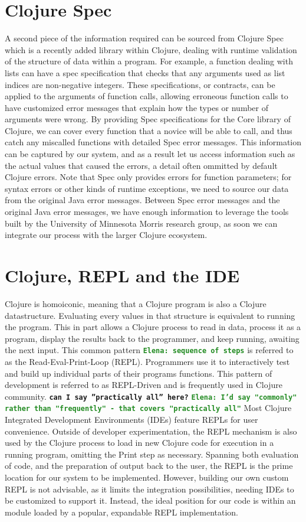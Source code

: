 \documentclass[12pt]{article}
\newcommand{\comment}[1]{{\bf \tt  {#1}}}
\newcommand{\emcomment}[1]{\textcolor{ForestGreen}{\comment{Elena: {#1}}}}
\begin{document}
\section{Clojure Spec}
A second piece of the information required can be sourced from Clojure Spec~\cite{spec}
which is a recently added library within Clojure, dealing with runtime validation of
the structure of data within a program. For example, a function dealing with
lists can have a spec specification that checks that any arguments used as list indices
are non-negative integers.
These specifications, or contracts, can be applied to
 the arguments of function calls, allowing erroneous function calls to have
customized error messages that explain how the types or number of arguments were wrong.
By providing Spec specifications for the Core library of Clojure,
 we can cover every function that a novice will be able to call, and thus catch
 any miscalled functions with detailed Spec error messages.
 This information can be captured by our system, and as a result
 let us access information such as the actual values that caused the errors,
 a detail often ommitted by default Clojure errors.
Note that Spec only provides errors for function parameters; for syntax errors or other kinds of
runtime exceptions, we need to source our data from the original Java error messages.
Between Spec error messages and the original Java error messages, we have enough
information to leverage the tools built by the
 University of Minnesota Morris research group, as soon we can integrate
 our process with the larger Clojure ecosystem.

\section{Clojure, REPL and the IDE}
Clojure is homoiconic, meaning that a Clojure program is also a Clojure datastructure.
 Evaluating every values in that structure is
equivalent to running the program.
This in part allows a Clojure process to read in data, process it as a program, display the results
 back to the programmer, and keep running, awaiting the next input.
 This common pattern \emcomment{sequence of steps} is referred to
as the Read-Eval-Print-Loop (REPL). Programmers use it to interactively test and build up
individual parts of their programs functions. This pattern of development is
referred to as REPL-Driven and is frequently used in Clojure community.
\comment{can I say ''practically all'' here?}
\emcomment{I'd say "commonly" rather than "frequently" - that covers "practically all"}
 Most Clojure Integrated Development Environments (IDEs) feature REPLs for
 user convenience. Outside of developer experimentation, the REPL mechanism is also used
by the Clojure process to load in new Clojure code for execution in a running program,
omitting the Print step as necessary.
Spanning both evaluation of code, and the preparation of output back to the user,
the REPL is the prime location for our system to be implemented.
However, building our own custom REPL is not advisable, as it limits the
integration possibilities, needing IDEs to be customized to support it.
Instead, the ideal position for our code is within an module loaded
by a popular, expandable REPL implementation.
\end{document}
